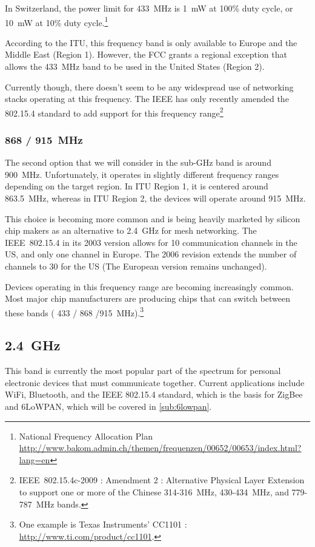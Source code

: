 In Switzerland, the power limit for \SI{433}{MHz} is \SI{1}{mW} at 100\% duty
cycle, or \SI{10}{mW} at 10\% duty cycle.\footnote{National Frequency Allocation Plan
\url{http://www.bakom.admin.ch/themen/frequenzen/00652/00653/index.html?lang=en}}

According to the ITU, this frequency band is only available to Europe and the
Middle East (Region 1). However, the FCC grants a regional exception that allows
the \SI{433}{MHz} band to be used in the United States (Region 2).

Currently though, there doesn't seem to be any widespread use of networking
stacks operating at this frequency. The IEEE has only recently amended the
802.15.4 standard to add support for this frequency
range\footnote{IEEE~802.15.4c\texttrademark{}-2009 : Amendment 2 : Alternative Physical Layer
Extension to support one or more of the Chinese 314-316~MHz, 430-434~MHz, and
779-787~MHz bands.}

\subsubsection{868 / \SI{915}{MHz}}

The second option that we will consider in the sub-GHz band is around
\SI{900}{MHz}. Unfortunately, it operates in slightly different frequency ranges
depending on the target region. In \ac{ITU} Region 1, it is centered around
\SI{863.5}{MHz}, whereas in ITU Region 2, the devices will operate around
\SI{915}{MHz}.

This choice is becoming more common and is being heavily marketed by silicon
chip makers as an alternative to \SI{2.4}{GHz} for mesh networking. The
IEEE~802.15.4 in its 2003 version allows for 10 communication channels in the
US, and only one channel in Europe. The 2006 revision extends the number of
channels to 30 for the US (The European version remains unchanged).

Devices operating in this frequency range are becoming increasingly common. Most
major chip manufacturers are producing chips that can switch between these bands
( 433 / 868 /\SI{915}{MHz}).\footnote{One example is Texas Instruments' CC1101
: \url{http://www.ti.com/product/cc1101}.}

\subsection{\SI{2.4}{GHz}}

This band is currently the most popular part of the spectrum for personal
electronic devices that must communicate together. Current applications include
WiFi, Bluetooth, and the IEEE 802.15.4 standard, which is the basis for ZigBee
and \ac{6LoWPAN}, which will be covered in \autoref{sub:6lowpan}.

